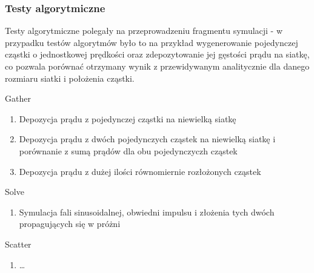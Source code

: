     \subsubsection{Testy algorytmiczne}
    Testy algorytmiczne polegały na przeprowadzeniu fragmentu symulacji - w
    przypadku testów algorytmów było to na przykład wygenerowanie pojedynczej
    cząstki o jednostkowej prędkości oraz zdepozytowanie jej gęstości prądu na
    siatkę, co pozwala porównać otrzymany wynik z przewidywanym analitycznie
    dla danego rozmiaru siatki i położenia cząstki.
    \begin{enumerate}
        \itemi Gather
            \begin{enumerate}
                \item Depozycja prądu z pojedynczej cząstki na niewielką siatkę
                \item Depozycja prądu z dwóch pojedynczych cząstek na niewielką
                    siatkę i porównanie z sumą prądów dla obu pojedynczyczh
                    cząstek
                \item Depozycja prądu z dużej ilości równomiernie rozłożonych
                    cząstek
            \end{enumerate}

        \itemi Solve
            \begin{enumerate}
                \item Symulacja fali sinusoidalnej, obwiedni impulsu i złożenia
                    tych dwóch propagujących się w próżni
            \end{enumerate}

        \itemi Scatter
            \begin{enumerate}
                \item \ldots {}
            \end{enumerate}


\end{enumerate}
